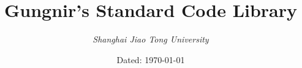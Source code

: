 \documentclass{book}
\begin{document}
	\title{\textbf{\LARGE{Gungnir's Standard Code Library}}}
	\author{\emph{Shanghai Jiao Tong University}}
	\date{Dated: \today}
	\maketitle
	\tableofcontents
	\def \source {../source}
	\begin{spacing}{1.0}
		
	\end{spacing}
\end{document}
